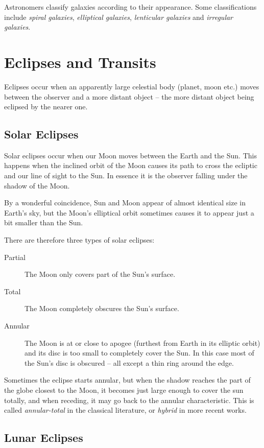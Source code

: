 Astronomers classify galaxies according to their appearance. Some
classifications include \emph{spiral galaxies}, \emph{elliptical
galaxies}, \emph{lenticular galaxies} and \emph{irregular galaxies}.



\section{Eclipses and Transits}
\label{sec:Eclipses}

Eclipses occur when an apparently large celestial body (planet, moon
etc.) moves between the observer and a more distant object
-- the more distant object being eclipsed by the nearer one.

\subsection{Solar Eclipses}
\label{sec:Eclipses:solar}

Solar eclipses occur when our Moon moves between the Earth and the Sun.
This happens when the inclined orbit of the Moon causes its path to
cross the ecliptic and our line of sight to the Sun. In essence it is the observer
falling under the shadow of the Moon. 

By a wonderful coincidence, Sun and Moon appear of almost identical
size in Earth's sky, but the Moon's elliptical orbit sometimes causes
it to appear just a bit smaller than the Sun.

There are therefore three types of solar eclipses:
\begin{description}
\item[Partial] The Moon only covers part of the Sun's surface.
\item[Total] The Moon completely obscures the Sun's surface.
\item[Annular] The Moon is at or close to apogee (furthest from Earth in its
elliptic orbit) and its disc is too small to completely cover the Sun.
In this case most of the Sun's disc is obscured -- all except a thin ring
around the edge.
\end{description}
Sometimes the eclipse starts annular, but when the shadow reaches the
part of the globe closest to the Moon, it becomes just large enough to
cover the sun totally, and when receding, it may go back to the
annular characteristic. This is called \emph{annular-total} in the
classical literature, or \emph{hybrid} in more recent works.

\subsection{Lunar Eclipses}
\label{sec:Eclipses:lunar}

